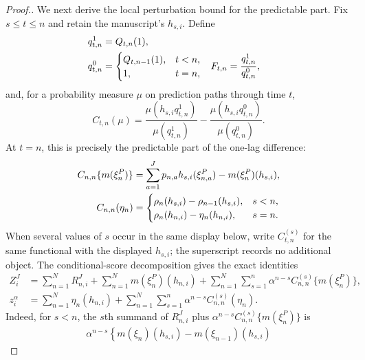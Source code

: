 \documentclass[11pt]{article}
\theoremstyle{thmstylethree}%
\begin{document}
\begin{proof}[Proof.]
We next derive the local perturbation bound for the predictable part.
Fix $s\leq t\leq n$ and retain the manuscript's $h_{s,i}$.  Define
\begin{align}
q_{t,n}^{1}
&=Q_{t,n}(1),                                                \notag\\
q_{t,n}^{0}
&=
\begin{cases}
Q_{t,n-1}(1),&t<n,\\
1,&t=n,
\end{cases}
&
F_{t,n}
&=\frac{q_{t,n}^{1}}{q_{t,n}^{0}},
\label{eq:dmop-direct-local-future-functions}
\end{align}
and, for a probability measure $\mu$ on prediction paths through time
$t$,
\begin{equation}
C_{t,n}(\mu)
=
\frac{\mu(h_{s,i}q_{t,n}^{1})}{\mu(q_{t,n}^{1})}
-
\frac{\mu(h_{s,i}q_{t,n}^{0})}{\mu(q_{t,n}^{0})}.
\label{eq:dmop-direct-continuation-functional}
\end{equation}
At $t=n$, this is precisely the predictable part of the one-lag
difference:
\begin{align}
C_{n,n}\{m(\xi_n^P)\}
&=
\sum_{a=1}^Jp_{n,a}h_{s,i}(\xi_{n,a}^P)
-m(\xi_n^P)(h_{s,i}),                                      \notag\\
C_{n,n}(\eta_n)
&=
\begin{cases}
\rho_n(h_{s,i})-\rho_{n-1}(h_{s,i}),&s<n,\\
\rho_n(h_{n,i})-\eta_n(h_{n,i}),&s=n.
\end{cases}
\label{eq:dmop-direct-continuation-endpoints}
\end{align}
When several values of $s$ occur in the same display below, write
$C_{t,n}^{(s)}$ for the same functional with the displayed $h_{s,i}$;
the superscript records no additional object.  The conditional-score
decomposition gives the exact identities
\begin{align}
Z_i^J
&=
\sum_{n=1}^{N}R_{n,i}^J
+\sum_{n=1}^{N}m(\xi_n^P)(h_{n,i})
+\sum_{n=1}^{N}\sum_{s=1}^{n}
\alpha^{n-s}C_{n,n}^{(s)}\{m(\xi_n^P)\},
\label{eq:dmop-direct-exact-predictor-decomposition}
\\
z_i^\alpha
&=
\sum_{n=1}^{N}\eta_n(h_{n,i})
+\sum_{n=1}^{N}\sum_{s=1}^{n}
\alpha^{n-s}C_{n,n}^{(s)}(\eta_n).
\label{eq:dmop-direct-exact-population-decomposition}
\end{align}
Indeed, for $s<n$, the $s$th summand of $R_{n,i}^J$ plus
$\alpha^{n-s}C_{n,n}^{(s)}\{m(\xi_n^P)\}$ is
\begin{align}
\alpha^{n-s}
\left\{
m(\xi_n)(h_{s,i})-m(\xi_{n-1})(h_{s,i})

\end{align}
\end{proof}
\end{document}
